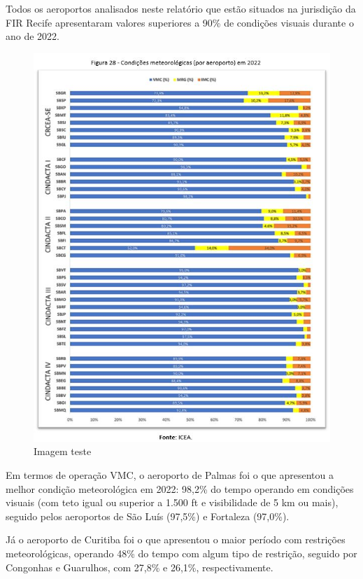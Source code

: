 \documentclass[
]{book}
\begin{document}
Todos os aeroportos analisados neste relatório que estão situados na jurisdição da FIR Recife apresentaram valores superiores a 90\% de condições visuais durante o ano de 2022.

\begin{figure}
\centering
\includegraphics{imagens/fig32.jpg}
\caption{Imagem teste}
\end{figure}

Em termos de operação VMC, o aeroporto de Palmas foi o que apresentou a melhor condição meteorológica em 2022: 98,2\% do tempo operando em condições visuais (com teto igual ou superior a 1.500 ft e visibilidade de 5 km ou mais), seguido pelos aeroportos de São Luís (97,5\%) e Fortaleza (97,0\%).

Já o aeroporto de Curitiba foi o que apresentou o maior período com restrições meteorológicas, operando 48\% do tempo com algum tipo de restrição, seguido por Congonhas e Guarulhos, com 27,8\% e 26,1\%, respectivamente.
\end{document}
